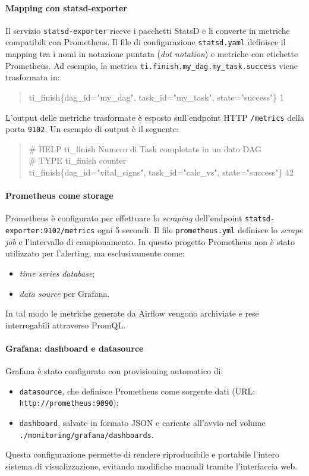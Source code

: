 \paragraph{Mapping con statsd-exporter}
Il servizio \texttt{statsd-exporter} riceve i pacchetti StatsD e li converte in metriche compatibili con Prometheus.  
Il file di configurazione \texttt{statsd.yaml} definisce il mapping tra i nomi in notazione puntata (\emph{dot notation}) e metriche con etichette Prometheus.  
Ad esempio, la metrica \texttt{ti.finish.my\_dag.my\_task.success} viene trasformata in:
\begin{quote}\ttfamily
ti\_finish\{dag\_id="my\_dag", task\_id="my\_task", state="success"\} 1
\end{quote}
L’output delle metriche trasformate è esposto sull’endpoint HTTP \texttt{/metrics} della porta \texttt{9102}.  
Un esempio di output è il seguente:
\begin{quote}\ttfamily
\# HELP ti\_finish Numero di Task completate in un dato DAG \\
\# TYPE ti\_finish counter \\
ti\_finish\{dag\_id="vital\_signs", task\_id="calc\_vs", state="success"\} 42
\end{quote}

\paragraph{Prometheus come storage}
Prometheus è configurato per effettuare lo \emph{scraping} dell’endpoint \texttt{statsd-exporter:9102/metrics} ogni 5 secondi.  
Il file \texttt{prometheus.yml} definisce lo \emph{scrape job} e l’intervallo di campionamento.  
In questo progetto Prometheus non è stato utilizzato per l’alerting, ma esclusivamente come:
\begin{itemize}
    \item \emph{time series database};
    \item \emph{data source} per Grafana.
\end{itemize}
In tal modo le metriche generate da Airflow vengono archiviate e rese interrogabili attraverso PromQL.

\paragraph{Grafana: dashboard e datasource}
Grafana è stato configurato con provisioning automatico di:
\begin{itemize}
    \item \texttt{datasource}, che definisce Prometheus come sorgente dati (URL: \texttt{http://prometheus:9090});
    \item \texttt{dashboard}, salvate in formato JSON e caricate all’avvio nel volume \texttt{./monitoring/grafana/dashboards}.
\end{itemize}
Questa configurazione permette di rendere riproducibile e portabile l’intero sistema di visualizzazione, evitando modifiche manuali tramite l’interfaccia web.

